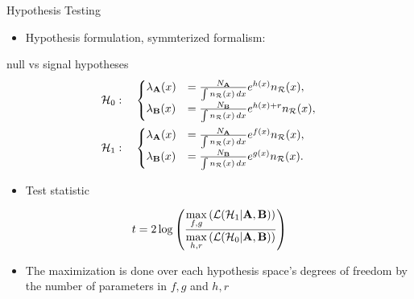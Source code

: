 \documentclass[notheorems]{beamer}
\begin{document}
\begin{frame}{Hypothesis Testing}
    \begin{itemize}
        \item Hypothesis formulation, symmterized formalism:
    \end{itemize}
    \begin{block}{null vs signal hypotheses}
        \begin{equation}
        \begin{aligned}
            \nullhypothesis &: \quad
            \begin{cases}
                \pdf_{\dataset{A}}(\eventsymbol)
                &=
                \frac{N_{\dataset{A}}}
                    {\int \refdist[\eventsymbol]\,d\eventsymbol}
                e^{h(\eventsymbol)} \refdist[\eventsymbol],
                \\
                \pdf_{\dataset{B}}(\eventsymbol)
                &=
                \frac{N_{\dataset{B}}}
                    {\int \refdist[\eventsymbol]\,d\eventsymbol}
                e^{h(\eventsymbol)+r} \refdist[\eventsymbol],
            \end{cases} \\
            \hypothesis{1} &: \quad
            \begin{cases}
                \pdf_{\dataset{A}}(\eventsymbol)
                &=
                \frac{N_{\dataset{A}}}
                    {\int \refdist[\eventsymbol]\,d\eventsymbol}
                e^{f(\eventsymbol)} \refdist[\eventsymbol],
                \\
                \pdf_{\dataset{B}}(\eventsymbol)
                &=
                \frac{N_{\dataset{B}}}
                    {\int \refdist[\eventsymbol]\,d\eventsymbol}
                e^{g(\eventsymbol)} \refdist[\eventsymbol].
            \end{cases}
        \end{aligned}
        \end{equation}
    \end{block}
    \begin{itemize}
        \item Test statistic
    \end{itemize}
    \begin{equation}
        t = 2 \log \left(
            \dfrac{
                \max\limits_{f, g} \left(
                    \likelihood(\hypothesis{1}|\dataset{A}, \dataset{B})
                \right)
            }{
                \max\limits_{h, r} \left(
                    \likelihood(\nullhypothesis|\dataset{A}, \dataset{B})
                \right)
            }
        \right)
    \end{equation}
    \begin{itemize}
        \item The maximization is done over each hypothesis space's degrees of freedom by the number of parameters in $f, g$ and $h, r$
    \end{itemize}
\end{frame}
\end{document}
